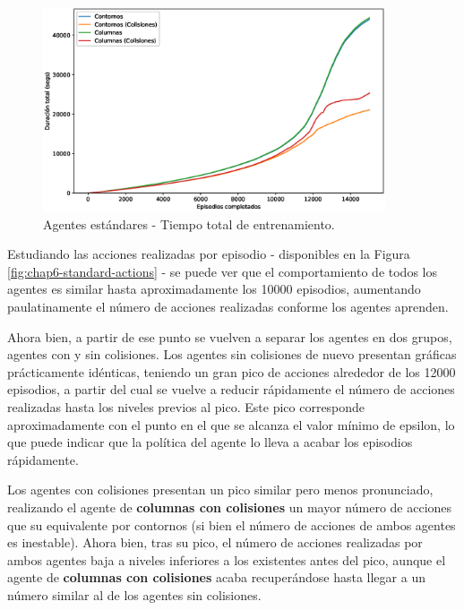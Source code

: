 \begin{figure}[H]
    \centering
    \includegraphics[width=0.9\textwidth]{imagenes/cap6/standard/cumulative_smoothed_times.eps}
    \caption{Agentes estándares - Tiempo total de entrenamiento.}
    \label{fig:chap6-standard-time}
\end{figure}

Estudiando las acciones realizadas por episodio - disponibles en la Figura \ref{fig:chap6-standard-actions} - se puede ver que el comportamiento de todos los agentes es similar hasta aproximadamente los 10000 episodios, aumentando paulatinamente el número de acciones realizadas conforme los agentes aprenden.

Ahora bien, a partir de ese punto se vuelven a separar los agentes en dos grupos, agentes con y sin colisiones. Los agentes sin colisiones de nuevo presentan gráficas prácticamente idénticas, teniendo un gran pico de acciones alrededor de los 12000 episodios, a partir del cual se vuelve a reducir rápidamente el número de acciones realizadas hasta los niveles previos al pico. Este pico corresponde aproximadamente con el punto en el que se alcanza el valor mínimo de epsilon, lo que puede indicar que la política del agente lo lleva a acabar los episodios rápidamente.

Los agentes con colisiones presentan un pico similar pero menos pronunciado, realizando el agente de \textbf{columnas con colisiones} un mayor número de acciones que su equivalente por contornos (si bien el número de acciones de ambos agentes es inestable). Ahora bien, tras su pico, el número de acciones realizadas por ambos agentes baja a niveles inferiores a los existentes antes del pico, aunque el agente de \textbf{columnas con colisiones} acaba recuperándose hasta llegar a un número similar al de los agentes sin colisiones.

